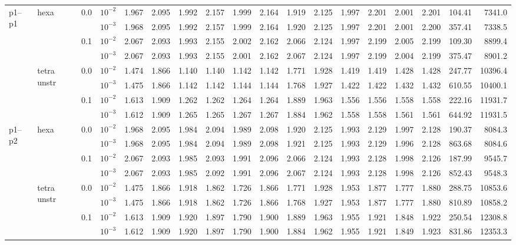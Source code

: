 \begin{longtable}{llclrrrrrrrrrrrrrr}
\multirow{8}{*}{p1--p1} & \multirow{4}{*}{hexa} & \multirow{2}{*}{0.0} & $10^{-2}$ & 1.967 & 2.095 & 1.992 & 2.157 & 1.999 & 2.164 & 1.919 & 2.125 & 1.997 & 2.201 & 2.001 & 2.201 & 104.41 & 7341.0 \\
& & & $10^{-3}$ & 1.968 & 2.095 & 1.992 & 2.157 & 1.999 & 2.164 & 1.920 & 2.125 & 1.997 & 2.201 & 2.001 & 2.200 & 357.41 & 7338.5 \\\cline{3-18}
& & \multirow{2}{*}{0.1} & $10^{-2}$ & 2.067 & 2.093 & 1.993 & 2.155 & 2.002 & 2.162 & 2.066 & 2.124 & 1.997 & 2.199 & 2.005 & 2.199 & 109.30 & 8899.4 \\
& & & $10^{-3}$ & 2.067 & 2.093 & 1.993 & 2.155 & 2.001 & 2.162 & 2.067 & 2.124 & 1.997 & 2.199 & 2.004 & 2.199 & 375.47 & 8901.2 \\\cline{2-18}
& \multirow{4}{*}{tetra unstr} & \multirow{2}{*}{0.0} & $10^{-2}$ & 1.474 & 1.866 & 1.140 & 1.140 & 1.142 & 1.142 & 1.771 & 1.928 & 1.419 & 1.419 & 1.428 & 1.428 & 247.77 & 10396.4 \\
& & & $10^{-3}$ & 1.475 & 1.866 & 1.142 & 1.142 & 1.144 & 1.144 & 1.768 & 1.927 & 1.422 & 1.422 & 1.432 & 1.432 & 610.55 & 10400.1 \\\cline{3-18}
& & \multirow{2}{*}{0.1} & $10^{-2}$ & 1.613 & 1.909 & 1.262 & 1.262 & 1.264 & 1.264 & 1.889 & 1.963 & 1.556 & 1.556 & 1.558 & 1.558 & 222.16 & 11931.7 \\
& & & $10^{-3}$ & 1.612 & 1.909 & 1.265 & 1.265 & 1.267 & 1.267 & 1.884 & 1.962 & 1.558 & 1.558 & 1.561 & 1.561 & 644.92 & 11931.5 \\\hline

\multirow{8}{*}{p1--p2} & \multirow{4}{*}{hexa} & \multirow{2}{*}{0.0} & $10^{-2}$ & 1.968 & 2.095 & 1.984 & 2.094 & 1.989 & 2.098 & 1.920 & 2.125 & 1.993 & 2.129 & 1.997 & 2.128 & 190.37 & 8084.3 \\
& & & $10^{-3}$ & 1.968 & 2.095 & 1.984 & 2.094 & 1.989 & 2.098 & 1.921 & 2.125 & 1.993 & 2.129 & 1.996 & 2.128 & 863.68 & 8084.6 \\\cline{3-18}
& & \multirow{2}{*}{0.1} & $10^{-2}$ & 2.067 & 2.093 & 1.985 & 2.093 & 1.991 & 2.096 & 2.066 & 2.124 & 1.993 & 2.128 & 1.998 & 2.126 & 187.99 & 9545.7 \\
& & & $10^{-3}$ & 2.067 & 2.093 & 1.985 & 2.092 & 1.991 & 2.096 & 2.067 & 2.124 & 1.993 & 2.128 & 1.998 & 2.126 & 852.43 & 9548.3 \\\cline{2-18}
& \multirow{4}{*}{tetra unstr} & \multirow{2}{*}{0.0} & $10^{-2}$ & 1.475 & 1.866 & 1.918 & 1.862 & 1.726 & 1.866 & 1.771 & 1.928 & 1.953 & 1.877 & 1.777 & 1.880 & 288.75 & 10853.6 \\
& & & $10^{-3}$ & 1.475 & 1.866 & 1.918 & 1.862 & 1.726 & 1.866 & 1.768 & 1.927 & 1.953 & 1.877 & 1.777 & 1.880 & 810.89 & 10858.2 \\\cline{3-18}
& & \multirow{2}{*}{0.1} & $10^{-2}$ & 1.613 & 1.909 & 1.920 & 1.897 & 1.790 & 1.900 & 1.889 & 1.963 & 1.955 & 1.921 & 1.848 & 1.922 & 250.54 & 12308.8 \\
& & & $10^{-3}$ & 1.612 & 1.909 & 1.920 & 1.897 & 1.790 & 1.900 & 1.884 & 1.962 & 1.955 & 1.921 & 1.849 & 1.923 & 831.86 & 12353.3 \\\hline


\end{longtable}
